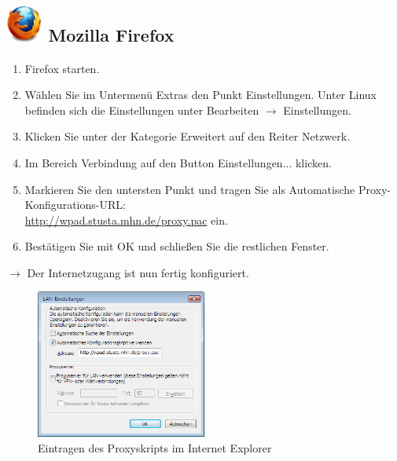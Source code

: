 \documentclass[a4paper,12pt]{scrartcl}
\begin{document}
\subsection*{\includegraphics[height=1.2cm,keepaspectratio]{Bilder/Firefox_35_logo} Mozilla Firefox}
\begin{enumerate}
    \item Firefox starten.
    \item Wählen Sie im Untermenü Extras den Punkt Einstellungen. Unter Linux befinden sich die Einstellungen unter Bearbeiten $\rightarrow$ Einstellungen.
    \item Klicken Sie unter der Kategorie Erweitert auf den Reiter Netzwerk.
    \item Im Bereich Verbindung auf den Button Einstellungen... klicken.
    \item Markieren Sie den untersten Punkt und tragen Sie als Automatische Proxy-Konfigurations-URL: \\ \url{http://wpad.stusta.mhn.de/proxy.pac} ein.
    \item Bestätigen Sie mit OK und schließen Sie die restlichen Fenster.
\end{enumerate}
$\rightarrow$ Der Internetzugang ist nun fertig konfiguriert.


\begin{figure}
  \begin{center}
    \includegraphics[width=0.5\textwidth,keepaspectratio]{Bilder/Proxy_IE}
  \end{center}
  \caption{Eintragen des Proxyskripts im Internet Explorer}
\end{figure}
\end{document}
